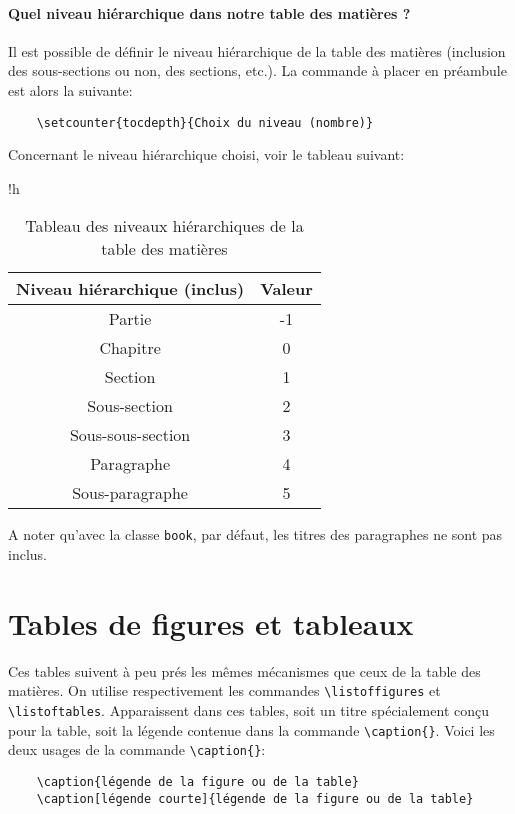 \paragraph*{Quel niveau hiérarchique dans notre table des matières ?}
Il est possible de définir le niveau hiérarchique de la table des matières (inclusion des sous-sections ou non, des sections, etc.). La commande à placer en préambule est alors la suivante:
\begin{verbatim}
    \setcounter{tocdepth}{Choix du niveau (nombre)}
\end{verbatim}
\medskip

Concernant le niveau hiérarchique choisi, voir le tableau suivant:
\begin{table}{!h}
\begin{center}
\begin{tabular}{|c|c|}
\hline
\textbf{Niveau hiérarchique (inclus)} & \textbf{Valeur} \\
\hline
Partie & -1 \\
\hline
Chapitre & 0 \\
\hline
Section & 1 \\
\hline
Sous-section & 2 \\
\hline
Sous-sous-section & 3 \\
\hline
Paragraphe & 4 \\
\hline
Sous-paragraphe & 5 \\
\hline
\end{tabular}
\caption{Tableau des niveaux hiérarchiques de la table des matières}
\end{center}
\end{table}
\medskip

A noter qu'avec la classe \texttt{book}, par défaut, les titres des paragraphes ne sont pas inclus.
\medskip

\section{Tables de figures et tableaux}
Ces tables suivent à peu prés les mêmes mécanismes que ceux de la table des matières. On utilise respectivement les commandes \verb|\listoffigures| et \verb|\listoftables|. Apparaissent dans ces tables, soit un titre spécialement conçu pour la table, soit la légende contenue dans la commande \verb|\caption{}|. Voici les deux usages de la commande \verb|\caption{}|:
\begin{verbatim}
    \caption{légende de la figure ou de la table}
    \caption[légende courte]{légende de la figure ou de la table}
\end{verbatim}
\medskip

